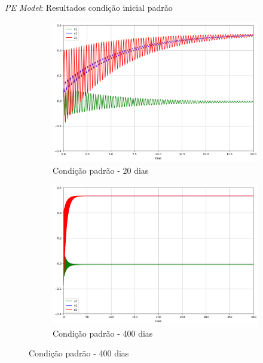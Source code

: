 
\begin{frame}{\textit{PE Model}: Resultados condição inicial padrão}
   \begin{figure}
       \centering
       \begin{subfigure}[b]{0.45\textwidth}
           \centering
           \includegraphics[width=\textwidth]{img/p01d20.png}
           \caption{Condição padrão - 20 dias}
           \label{fig:p01d20}
       \end{subfigure}
       \hfill
       \begin{subfigure}[b]{0.45\textwidth}
           \centering
           \includegraphics[width=\textwidth]{img/p01d400.png}
           \caption{Condição padrão - 400 dias}
           \label{fig:p01d400}
       \end{subfigure}
   \end{figure}
\end{frame}


